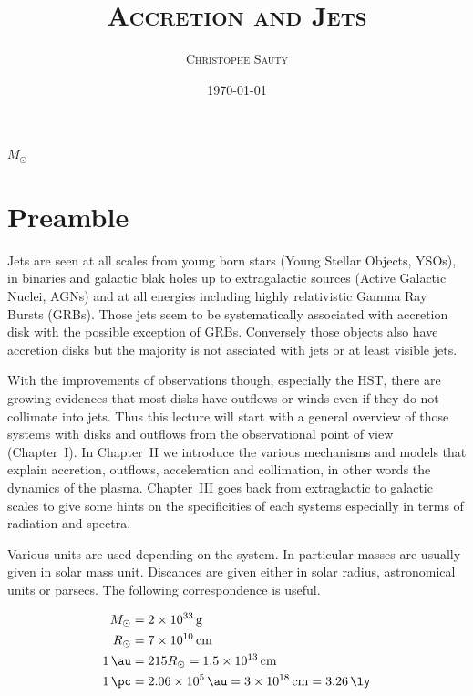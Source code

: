 \documentclass[10pt,a4paper,english,draft]{article}
\title{\textsc{Accretion and Jets}}
\author{\textsc{Christophe Sauty}}
\date{\today}
\begin{document}

\maketitle

\begin{center}
    $M_{\odot}$ %
\end{center}

\section*{Preamble}

Jets are seen at all scales from young born stars (Young Stellar Objects,
YSOs), in binaries and galactic blak holes up to extragalactic sources (Active
Galactic Nuclei, AGNs) and at all energies including highly relativistic Gamma
Ray Bursts (GRBs). Those jets seem to be systematically associated with
accretion disk with the possible exception of GRBs. Conversely those objects
also have accretion disks but the majority is not assciated with jets or at
least visible jets.

With the improvements of observations though, especially the HST, there are
growing evidences that most disks have outflows or winds even if they do not
collimate into jets. Thus this lecture will start with a general overview of
those systems with disks and outflows from the observational point of view
(Chapter~I). In Chapter~II we introduce the various mechanisms and models that
explain accretion, outflows, acceleration and collimation, in other words the
dynamics of the plasma. Chapter~III goes back from extraglactic to galactic
scales to give some hints on the specificities of each systems especially in
terms of radiation and spectra.

Various units are used depending on the system. In particular masses are
usually given in solar mass unit. Discances are given either in solar radius,
astronomical units or parsecs. The following correspondence is useful.

\begin{align*}
    M_\odot &= \SI{2e33}{\gram} \\
    R_\odot &= \SI{7e10}{\cm} \\
    \SI{1}{\au} &= 215 R_\odot = \SI{1.5e13}{\cm} \\
    \SI{1}{\pc} &= \SI{2.06e5}{\au} = \SI{3e18}{\cm} = \SI{3.26}{\ly}
\end{align*}
\end{document}
